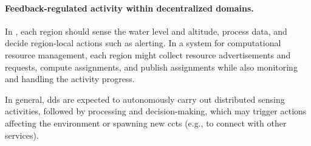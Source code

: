 %
%

%

\paragraph{ Feedback-regulated activity within decentralized domains.}
%
In \casename{}, each region
 should sense the water level and altitude,
 process data,
 and decide region-local actions such as alerting.
%
In a system for computational resource management,
 each region
 might collect resource advertisements and requests,
 compute assignments,
 and publish assignments
 while also monitoring and handling the activity progress.

In general, \acp{dd} are expected to autonomously carry out distributed sensing activities,
 followed by processing and decision-making,
which may trigger actions 
 affecting the environment
 or spawning new \acp{cct} (e.g., to connect with other services).
%

